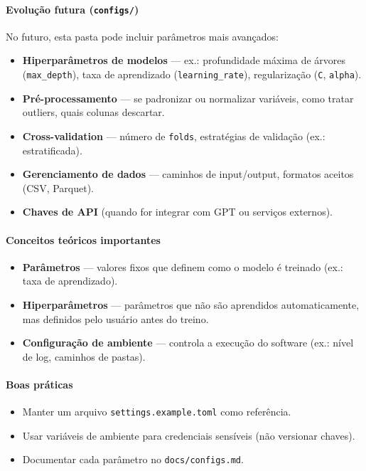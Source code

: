 \documentclass[12pt,a4paper]{article}
\begin{document}
\paragraph{Evolução futura (\texttt{configs/})}
No futuro, esta pasta pode incluir parâmetros mais avançados:  
\begin{itemize}
  \item \textbf{Hiperparâmetros de modelos} — ex.: profundidade máxima de árvores (\texttt{max\_depth}), taxa de aprendizado (\texttt{learning\_rate}), regularização (\texttt{C}, \texttt{alpha}).  
  \item \textbf{Pré-processamento} — se padronizar ou normalizar variáveis, como tratar outliers, quais colunas descartar.  
  \item \textbf{Cross-validation} — número de \texttt{folds}, estratégias de validação (ex.: estratificada).  
  \item \textbf{Gerenciamento de dados} — caminhos de input/output, formatos aceitos (CSV, Parquet).  
  \item \textbf{Chaves de API} (quando for integrar com GPT ou serviços externos).  
\end{itemize}

\paragraph{Conceitos teóricos importantes}
\begin{itemize}
  \item \textbf{Parâmetros} — valores fixos que definem como o modelo é treinado (ex.: taxa de aprendizado).  
  \item \textbf{Hiperparâmetros} — parâmetros que não são aprendidos automaticamente, mas definidos pelo usuário antes do treino.  
  \item \textbf{Configuração de ambiente} — controla a execução do software (ex.: nível de log, caminhos de pastas).  
\end{itemize}

\paragraph{Boas práticas}
\begin{itemize}
  \item Manter um arquivo \texttt{settings.example.toml} como referência.  
  \item Usar variáveis de ambiente para credenciais sensíveis (não versionar chaves).  
  \item Documentar cada parâmetro no \texttt{docs/configs.md}.  
\end{itemize}
\end{document}
